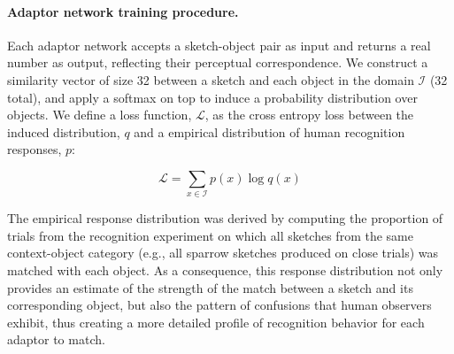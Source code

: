\documentclass[9pt,twocolumn,twoside]{pnas-new}
\begin{document}
{%



\paragraph{Adaptor network training procedure.}
Each adaptor network accepts a sketch-object pair as input and returns a real number as output, reflecting their perceptual correspondence. 
We construct a similarity vector of size 32 between a sketch and each object in the domain $\mathcal{I}$ (32 total), and apply a softmax on top to induce a probability distribution over objects. We define a loss function, $\mathcal{L}$, as the cross entropy loss between the induced distribution, $q$ and a empirical distribution of human recognition responses, $p$:

\begin{equation}
    \mathcal{L} = \sum_{x \in \mathcal{I}} p(x)\log q(x)
    \label{eqn:cross_entropy}
\end{equation}

The empirical response distribution was derived by computing the proportion of trials from the recognition experiment on which all sketches from the same context-object category (e.g., all sparrow sketches produced on close trials) was matched with each object. As a consequence, this response distribution not only provides an estimate of the strength of the match between a sketch and its corresponding object, but also the pattern of confusions that human observers exhibit, thus creating a more detailed profile of recognition behavior for each adaptor to match.

}
\end{document}
